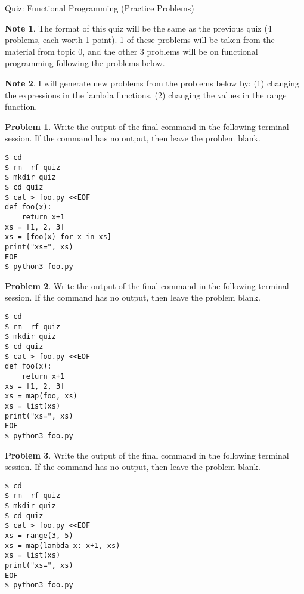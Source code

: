 \documentclass[10pt]{article}
\theoremstyle{definition}
\newtheorem{problem}{Problem}
\newtheorem{note}{Note}
\begin{document}
\begin{center}
    {
\Large
    Quiz: Functional Programming (Practice Problems)
}

    \vspace{0.1in}
\end{center}

\vspace{0.15in}
\noindent
\begin{note}
The format of this quiz will be the same as the previous quiz (4 problems, each worth 1 point).
1 of these problems will be taken from the material from topic 0,
and the other 3 problems will be on functional programming following the problems below.
\end{note}
\vspace{0.15in}

\begin{note}
    I will generate new problems from the problems below by: (1) changing the expressions in the lambda functions, (2) changing the values in the range function.
\end{note}
\vspace{0.15in}

\begin{problem}
    Write the output of the final command in the following terminal session.
    If the command has no output, then leave the problem blank.
\end{problem}
\begin{lstlisting}
$ cd
$ rm -rf quiz
$ mkdir quiz
$ cd quiz
$ cat > foo.py <<EOF
def foo(x):
    return x+1
xs = [1, 2, 3]
xs = [foo(x) for x in xs]
print("xs=", xs)
EOF
$ python3 foo.py
\end{lstlisting}
\vspace{0.4in}

\begin{problem}
    Write the output of the final command in the following terminal session.
    If the command has no output, then leave the problem blank.
\end{problem}
\begin{lstlisting}
$ cd
$ rm -rf quiz
$ mkdir quiz
$ cd quiz
$ cat > foo.py <<EOF
def foo(x):
    return x+1
xs = [1, 2, 3]
xs = map(foo, xs)
xs = list(xs)
print("xs=", xs)
EOF
$ python3 foo.py
\end{lstlisting}
\vspace{0.4in}

\newpage
\begin{problem}
    Write the output of the final command in the following terminal session.
    If the command has no output, then leave the problem blank.
\end{problem}
\begin{lstlisting}
$ cd
$ rm -rf quiz
$ mkdir quiz
$ cd quiz
$ cat > foo.py <<EOF
xs = range(3, 5)
xs = map(lambda x: x+1, xs)
xs = list(xs)
print("xs=", xs)
EOF
$ python3 foo.py
\end{lstlisting}
\vspace{0.4in}
\end{document}

